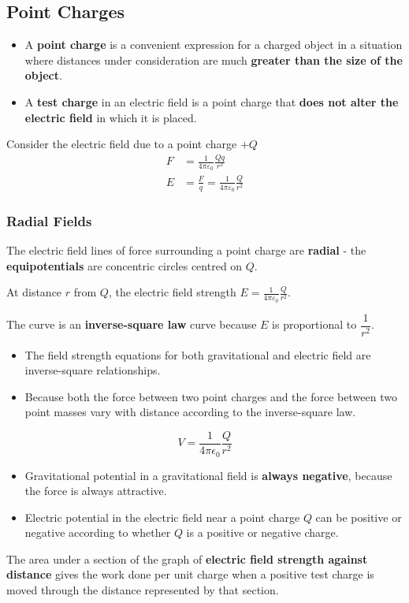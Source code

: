 \subsection{Point Charges}

\begin{itemize}
    \item A \textbf{point charge} is a convenient expression for a charged object in a situation where distances under consideration are much \textbf{greater than the size of the object}.
    \item A \textbf{test charge} in an electric field is a point charge that \textbf{does not alter the electric field} in which it is placed.
\end{itemize}

Consider the electric field due to a point charge $+Q$
\begin{align*}
    F&=\frac{1}{4\pi\varepsilon_0}\frac{Qq}{r^2}\\
    E&=\frac{F}{q}=\frac{1}{4\pi\varepsilon_0}\frac{Q}{r^2}
\end{align*}

\subsubsection*{Radial Fields}

The electric field lines of force surrounding a point charge are \textbf{radial} - the \textbf{equipotentials} are concentric circles centred on $Q$.

At distance $r$ from $Q$, the electric field strength $E=\frac{1}{4\pi\varepsilon_0}\frac{Q}{r^2}$.

The curve is an \textbf{inverse-square law} curve because $E$ is proportional to $\dfrac{1}{r^2}$.
\begin{itemize}
    \item The field strength equations for both gravitational and electric field are inverse-square relationships.
    \item Because both the force between two point charges and the force between two point masses vary with distance according to the inverse-square law.
\end{itemize}
$$V=\frac{1}{4\pi\epsilon_0}\frac{Q}{r^2}$$

\begin{itemize}
    \item Gravitational potential in a gravitational field is \textbf{always negative}, because the force is always attractive.
    \item Electric potential in the electric field near a point charge $Q$ can be positive or negative according to whether $Q$ is a positive or negative charge.
\end{itemize}

The area under a section of the graph of \textbf{electric field strength against distance} gives the work done per unit charge when a positive test charge is moved through the distance represented by that section.
